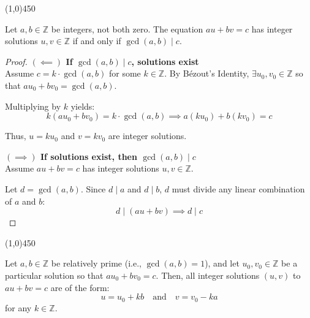 \begin{center}
    \vspace{10pt}
    \line(1,0){450}
    \vspace{25pt}
\end{center}

\newpage
\begin{proposition}
    Let $a, b \in \mathbb{Z}$ be integers, not both zero. The equation $au + bv = c$ has integer solutions $u, v \in \mathbb{Z}$ if and only if $\gcd(a, b) \mid c$.
\end{proposition}

\begin{proof}
    \textbf{$(\impliedby)$ If $\gcd(a, b) \mid c$, solutions exist} \\
    Assume $c = k \cdot \gcd(a, b)$ for some $k \in \mathbb{Z}$. By Bézout's Identity, $\exists u_0, v_0 \in \mathbb{Z}$ so that $au_0 + bv_0 = \gcd(a, b)$.
    
    Multiplying by $k$ yields:
    $$k(au_0 + bv_0) = k \cdot \gcd(a, b) \implies a(ku_0) + b(kv_0) = c$$
    
    Thus, $u = ku_0$ and $v = kv_0$ are integer solutions.

    \textbf{$(\implies)$ If solutions exist, then $\gcd(a, b) \mid c$} \\
    Assume $au + bv = c$ has integer solutions $u, v \in \mathbb{Z}$.
    
    Let $d = \gcd(a, b)$. Since $d \mid a$ and $d \mid b$, $d$ must divide any linear combination of $a$ and $b$:
    $$d \mid (au + bv) \implies d \mid c$$
\end{proof}

\begin{center}
    \vspace{10pt}
    \line(1,0){450}
    \vspace{25pt}
\end{center}
\begin{proposition}[All Integer Solutions to $au+bv=c$]
    Let $a, b \in \mathbb{Z}$ be relatively prime (i.e., $\gcd(a, b) = 1$), and let $u_0, v_0 \in \mathbb{Z}$ be a particular solution so that $au_0 + bv_0 = c$. Then, all integer solutions $(u, v)$ to $au + bv = c$ are of the form:
    $$u = u_0 + kb \quad \text{and} \quad v = v_0 - ka$$
    for any $k \in \mathbb{Z}$.
\end{proposition}

